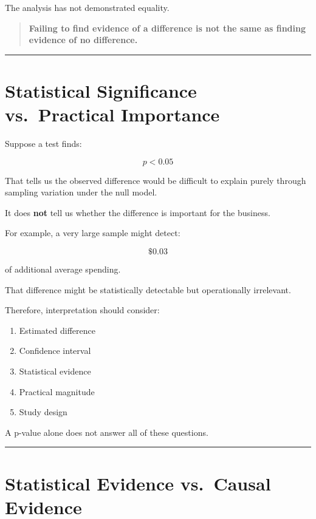\documentclass[
  letterpaper,
  DIV=11,
  numbers=noendperiod]{scrreprt}
\providecommand{\tightlist}{%
  \setlength{\itemsep}{0pt}\setlength{\parskip}{0pt}}
\begin{document}
The analysis has not demonstrated equality.

\begin{quote}
\textbf{Failing to find evidence of a difference is not the same as
finding evidence of no difference.}
\end{quote}

\begin{center}\rule{0.5\linewidth}{0.5pt}\end{center}


\chapter{Statistical Significance vs.~Practical
Importance}\label{statistical-significance-vs.-practical-importance}

Suppose a test finds:

\[
p<0.05
\]

That tells us the observed difference would be difficult to explain
purely through sampling variation under the null model.

It does \textbf{not} tell us whether the difference is important for the
business.

For example, a very large sample might detect:

\[
\$0.03
\]

of additional average spending.

That difference might be statistically detectable but operationally
irrelevant.

Therefore, interpretation should consider:

\begin{enumerate}
\def\labelenumi{\arabic{enumi}.}
\tightlist
\item
  Estimated difference
\item
  Confidence interval
\item
  Statistical evidence
\item
  Practical magnitude
\item
  Study design
\end{enumerate}

A p-value alone does not answer all of these questions.

\begin{center}\rule{0.5\linewidth}{0.5pt}\end{center}


\chapter{Statistical Evidence vs.~Causal
Evidence}\label{statistical-evidence-vs.-causal-evidence}
\end{document}
